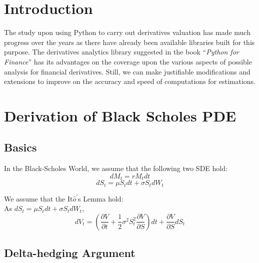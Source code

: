 \section{Introduction}
The study upon using Python to carry out derivatives valuation has made much progress over the years as there have already been available libraries built for this purpose. The derivatives analytics library suggested in the book ``\emph{Python for Finance}'' has its advantages on the coverage upon the various aspects of possible analysis for financial derivatives. Still, we can make justifiable modifications and extensions to improve on the accuracy and speed of computations for estimations. 
\\

\newpage

\section{Derivation of Black Scholes PDE}

\subsection{Basics}
\begin{center}
In the Black-Scholes World, we assume that the following two SDE hold:
$$dM_{t}  = rM_{t}dt$$
$$dS_{t}  = \mu S_{t}dt + \sigma S_{t} dW_{t}$$

We assume that the It$\hat{o}^{\prime}$s Lemma hold:\\[4mm]
As $dS_{t} = \mu S_{t}dt + \sigma S_{t}dW_{t}$,
$$dV_{t} = (\frac{\partial V}{\partial t}+\frac{1}{2}\sigma^{2}S_{t}^{2}\frac{\partial V}{\partial S})dt + \frac{\partial V}{\partial S}dS_{t}$$
\end{center}
\newpage

\subsection{Delta-hedging Argument}

